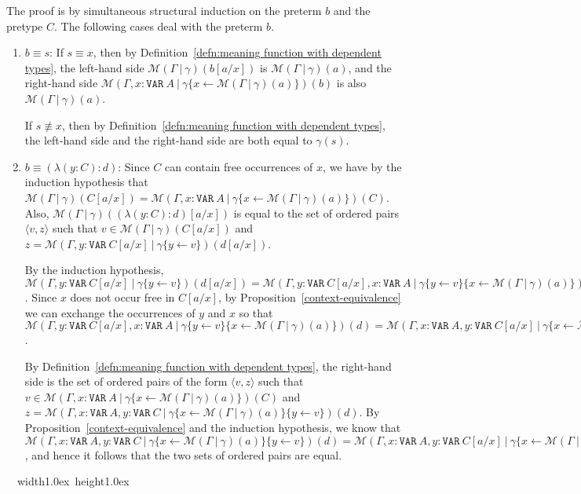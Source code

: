 \documentclass [12pt,twoside]{cslreport}
\newcommand{\thmbox}
   {{\ \hfill\hbox{%
      \vrule width1.0ex height1.0ex
   }\parfillskip 0pt }}
\newenvironment{proof}{{\bf Proof. }}{\thmbox}
\newcommand{\pair}[1]{\langle #1 \rangle}
\newcommand{\Mgamma}[1]{{\mathcal M}(\Gamma\vbar\gamma)(#1)}
\newcommand{\ttvar}{\mathtt{VAR}}
\newcommand{\vbar}{\ |\ }
\begin{document}
\begin{proof}
The proof is by simultaneous structural induction on the preterm $b$ and
the pretype $C$\@.  The following cases deal with the preterm $b$.
\begin{enumerate}
\item $b\equiv s$: If $s\equiv x$, then by
Definition~\ref{defn:meaning function with dependent types}, the left-hand
side $\Mgamma{b[a/x]}$ is 
$\Mgamma{a}$, and the right-hand side  $\mathcal{M}(\Gamma, x:\ttvar~A\vbar \gamma\{x\gets
\Mgamma{a}\})(b)$ is also $\Mgamma{a}$\@. 

If $s\not\equiv x$, then by
Definition~\ref{defn:meaning function with dependent types},
the left-hand side and the right-hand side
are both equal to $\gamma(s)$\@. 

\item $b \equiv (\lambda (y : C): d)$: Since $C$ can contain free
occurrences of $x$, we have by the induction hypothesis that
$\Mgamma{C[a/x]} = \mathcal{M}(\Gamma, x:\ttvar~A\vbar \gamma\{x\gets
\Mgamma{a}\})(C)$\@.  Also, $\Mgamma{(\lambda (y:C): d)[a/x]}$ is equal to
the set of ordered pairs $\pair{v, z}$ such that $v\in \Mgamma{C[a/x]}$
and $z = \mathcal{M}(\Gamma, y:\ttvar~C[a/x]\vbar \gamma\{y\gets
v\})(d[a/x])$\@.

By the induction hypothesis,
$\mathcal{M}(\Gamma, y:\ttvar~C[a/x]\vbar \gamma\{y\gets v\})(d[a/x])
= \mathcal{M}(\Gamma, y:\ttvar~C[a/x], x:\ttvar~A\vbar \gamma\{y\gets
v\}\{x\gets \Mgamma{a}\})(d)$\@.  Since $x$ does not occur free in
$C[a/x]$, by Proposition~\ref{context-equivalence} we can exchange the
occurrences of $y$ and $x$ so that 
$\mathcal{M}(\Gamma, y:\ttvar~C[a/x], x:\ttvar~A\vbar \gamma\{y\gets
v\}\{x\gets \Mgamma{a}\})(d) =
\mathcal{M}(\Gamma, x:\ttvar~A, y:\ttvar~C[a/x]\vbar \gamma\{x\gets \Mgamma{a}\}\{y\gets
v\})(d)$.

By Definition~\ref{defn:meaning function with dependent types},
the right-hand side is the set of ordered pairs of the form $\pair{v, z}$
such that $v\in \mathcal{M}(\Gamma, x: \ttvar~A \vbar \gamma\{x\gets
\Mgamma{a}\})(C)$
and $z = \mathcal{M}(\Gamma, x: \ttvar~A, y: \ttvar~C\vbar \gamma\{x\gets
\Mgamma{a}\}\{y\gets v\})(d)$\@.  By Proposition~\ref{context-equivalence}
and the induction hypothesis, we know that
$\mathcal{M}(\Gamma, x: \ttvar~A, y: \ttvar~C\vbar \gamma\{x\gets
\Mgamma{a}\}\{y\gets v\})(d) =
\mathcal{M}(\Gamma, x:\ttvar~A, y:\ttvar~C[a/x]\vbar \gamma\{x\gets \Mgamma{a}\}\{y\gets
v\})(d)$, and hence it follows that the two sets of ordered pairs are
equal.


\end{enumerate}
\end{proof}
\end{document}
